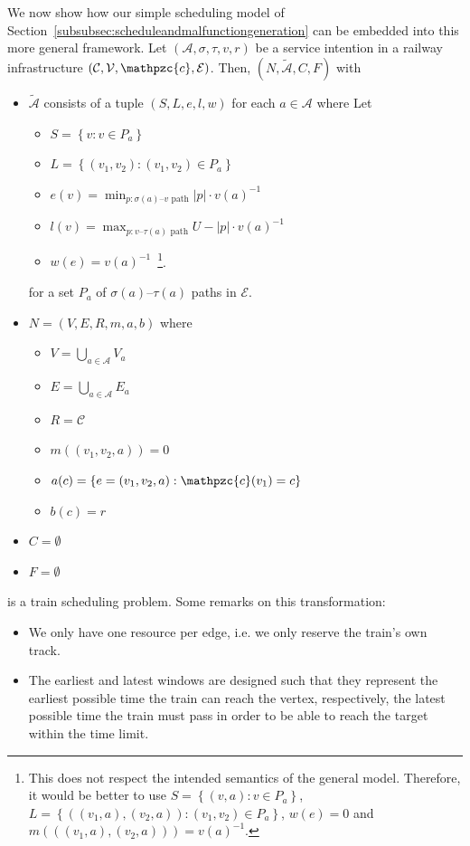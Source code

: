 \documentclass{article}
\begin{document}
We now show how our simple scheduling model of Section~\ref{subsubsec:scheduleandmalfunctiongeneration} can be embedded into this more general framework. Let $(\mathcal{A},\sigma,\tau,v,r)$ be a service intention in a railway infrastructure $(\mathcal{C}, \mathcal{V}, \mathpzc{c}, \mathcal{E})$.
Then, $(N,\tilde{\mathcal{A}},C,F)$ with
\begin{itemize}
    \item $\tilde{\mathcal{A}}$ consists of a tuple $(S,L,e,l,w)$ for each $a \in \mathcal{A}$ where Let
        \begin{itemize}
            \item $S=\left\{ v: v \in P_a\right\}$
            \item $L=\left\{ (v_1,v_2): (v_1,v_2) \in P_a\right\}$
            \item $e(v)=\min_{p: \sigma(a)\textrm{--}v\textrm{ path}} \left|p\right| \cdot {v(a)}^{-1}$
            \item $l(v)=\max_{p: v\textrm{--}\tau(a)\textrm{ path}} U-\left|p\right| \cdot {v(a)}^{-1}$
            \item $w(e)={v(a)}^{-1}$\mbox{  }\footnote{This does not respect the intended semantics of the general model. Therefore, it would be better to use $S=\left\{ (v,a): v \in P_a\right\}$, $L=\left\{ ((v_1,a),(v_2,a)): (v_1,v_2) \in P_a\right\}$, $w(e)=0$ and $m(((v_1,a),(v_2,a)))={v(a)}^{-1}$.}.
        \end{itemize}
        for a set $P_a$ of $\sigma(a)$--$\tau(a)$ paths in $\mathcal{E}$.
        \item $N=(V,E,R,m,a,b)$ where
        \begin{itemize}
            \item $V=\bigcup_{a \in \mathcal{A}} V_a$
            \item $E=\bigcup_{a \in \mathcal{A}} E_a$
            \item $R=\mathcal{C}$
            \item $m((v_1,v_2,a))=0$
            \item $a(c) = \left\{ e=(v_1,v_2,a): \mathpzc{c}(v_1)=c \right\}$
            \item $b(c)=r$
        \end{itemize}
    \item $C=\emptyset$
    \item $F=\emptyset$
\end{itemize}
is a train scheduling problem. Some remarks on this transformation:
\begin{itemize}
    \item We only have one resource per edge, i.e. we only reserve the train's own track.
    \item The earliest and latest windows are designed such that they represent the earliest possible time the train can reach the vertex, respectively, the latest possible time the train must pass in order to be able to reach the target within the time limit.
\end{itemize}
\end{document}
